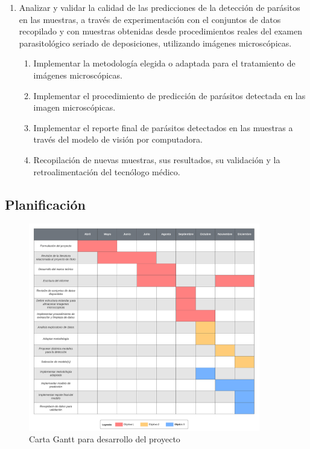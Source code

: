 \documentclass[letter,12pt]{report}
\begin{document}
\begin{enumerate}
    \item Analizar y validar la calidad de las predicciones de la detección de parásitos en
        las muestras, a través de experimentación con el conjuntos de datos recopilado y
        con muestras obtenidas desde procedimientos reales del examen parasitológico
        seriado de deposiciones, utilizando imágenes microscópicas.
        \begin{enumerate}
            \item Implementar la metodología elegida o adaptada para el tratamiento de
                imágenes microscópicas.
            \item Implementar el procedimiento de predicción de parásitos detectada en las
                imagen microscópicas.
            \item Implementar el reporte final de parásitos detectados en las muestras a
                través del modelo de visión por computadora.
            \item Recopilación de nuevas muestras, sus resultados, su validación y la
                retroalimentación del tecnólogo médico.
        \end{enumerate}
\end{enumerate}


\subsection{Planificación}
\begin{figure}[H]
    \centering
    \includegraphics[width=0.9\textwidth]{gantt}
    \caption{Carta Gantt para desarrollo del proyecto}
    \label{fig:gantt}
\end{figure}
\end{document}
